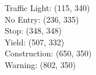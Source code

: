 Traffic Light: (115, 340) \\
No Entry: (236, 335) \\
Stop: (348, 348) \\
Yield: (507, 332) \\
Construction: (650, 350) \\
Warning: (802, 350) \\